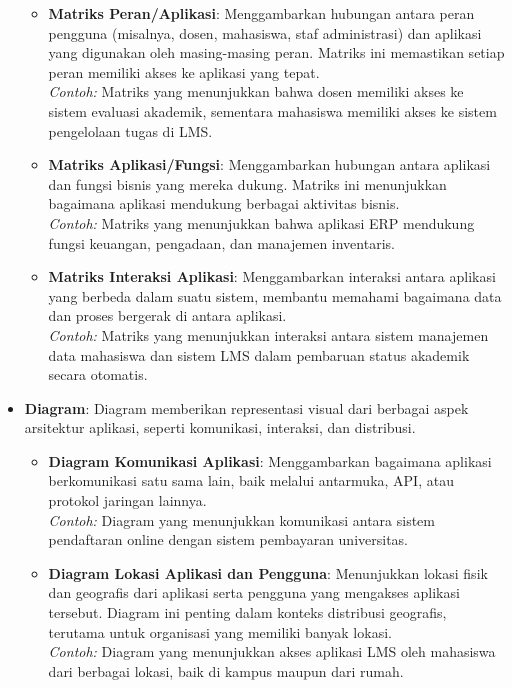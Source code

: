 \begin{itemize}
\begin{itemize}
		\item \textbf{Matriks Peran/Aplikasi}: Menggambarkan hubungan antara peran pengguna (misalnya, dosen, mahasiswa, staf administrasi) dan aplikasi yang digunakan oleh masing-masing peran. Matriks ini memastikan setiap peran memiliki akses ke aplikasi yang tepat. \\
		\textit{Contoh:} Matriks yang menunjukkan bahwa dosen memiliki akses ke sistem evaluasi akademik, sementara mahasiswa memiliki akses ke sistem pengelolaan tugas di LMS.
		
		\item \textbf{Matriks Aplikasi/Fungsi}: Menggambarkan hubungan antara aplikasi dan fungsi bisnis yang mereka dukung. Matriks ini menunjukkan bagaimana aplikasi mendukung berbagai aktivitas bisnis. \\
		\textit{Contoh:} Matriks yang menunjukkan bahwa aplikasi ERP mendukung fungsi keuangan, pengadaan, dan manajemen inventaris.
		
		\item \textbf{Matriks Interaksi Aplikasi}: Menggambarkan interaksi antara aplikasi yang berbeda dalam suatu sistem, membantu memahami bagaimana data dan proses bergerak di antara aplikasi. \\
		\textit{Contoh:} Matriks yang menunjukkan interaksi antara sistem manajemen data mahasiswa dan sistem LMS dalam pembaruan status akademik secara otomatis.
	\end{itemize}
	
	\item \textbf{Diagram}: Diagram memberikan representasi visual dari berbagai aspek arsitektur aplikasi, seperti komunikasi, interaksi, dan distribusi.
	
	\begin{itemize}
		\item \textbf{Diagram Komunikasi Aplikasi}: Menggambarkan bagaimana aplikasi berkomunikasi satu sama lain, baik melalui antarmuka, API, atau protokol jaringan lainnya. \\
		\textit{Contoh:} Diagram yang menunjukkan komunikasi antara sistem pendaftaran online dengan sistem pembayaran universitas.
		
		\item \textbf{Diagram Lokasi Aplikasi dan Pengguna}: Menunjukkan lokasi fisik dan geografis dari aplikasi serta pengguna yang mengakses aplikasi tersebut. Diagram ini penting dalam konteks distribusi geografis, terutama untuk organisasi yang memiliki banyak lokasi. \\
		\textit{Contoh:} Diagram yang menunjukkan akses aplikasi LMS oleh mahasiswa dari berbagai lokasi, baik di kampus maupun dari rumah.
		

\end{itemize}
\end{itemize}
